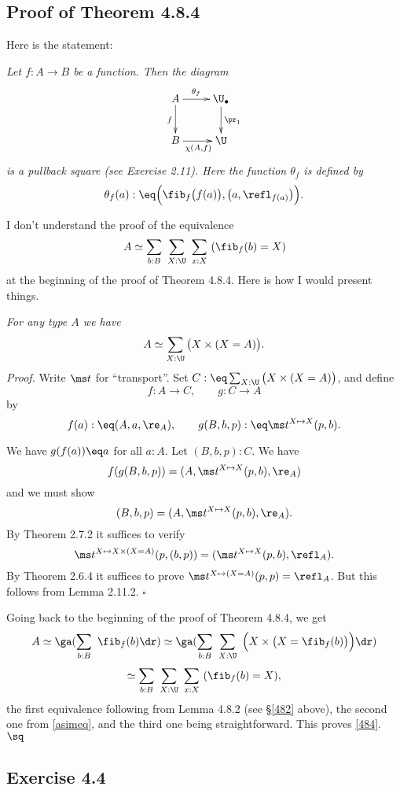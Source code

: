 \documentclass[12pt]{article}
\begin{document}

\subsection{Proof of Theorem 4.8.4}

Here is the statement:

\nn\emph{Let $f:A\to B$ be a function. Then the diagram
$$
\xymatrix{
A\ar[r]^-{\theta_f}\ar[d]_{f}&\U_\bullet\ar[d]^{\pr_1}\\
B\ar[r]_{\chi(A,f)} &\U}
$$ 
is a pullback square (see Exercise 2.11). Here the function $\theta_f$ is defined by}
$$
\theta_f(a):\eq\Big(\fib_f\big(f(a)\big),\big(a,\refl_{f(a)}\big)\Big).
$$

I don't understand the proof of the equivalence 
\begin{equation}\label{484}
A\simeq\sum_{b:B}\ \sum_{X:\U}\ \sum_{x:X}\ (\fib_f(b)=X)
\end{equation}
at the beginning of the proof of Theorem 4.8.4. Here is how I would present things. 

\nn{} \emph{For any type $A$ we have} 
\begin{equation}\label{asimeq}
A\simeq\sum_{X:\U}\big(X\times(X=A)\big).
\end{equation}
\emph{Proof.} Write $\ms t$ for ``transport''. Set $C:\eq\sum_{X:\U}\big(X\times(X=A)\big)$, and define 
$$
f:A\to C,\qquad g:C\to A
$$ 
by 
$$
f(a):\eq(A,a,\re_A),\qquad g(B,b,p):\eq\ms t^{X\mapsto X}(p,b).
$$ 

\nn We have $g(f(a))\eq a$ for all $a:A$. Let $(B,b,p):C$. We have 
$$
f(g(B,b,p))=(A,\ms t^{X\mapsto X}(p,b),\re_A)
$$ 
and we must show 
$$
(B,b,p)=(A,\ms t^{X\mapsto X}(p,b),\re_A).
$$
By Theorem 2.7.2 it suffices to verify 
$$
\ms t^{X\mapsto X\times(X=A)}(p,(b,p))=(\ms t^{X\mapsto X}(p,b),\refl_A).
$$ 
By Theorem 2.6.4 it suffices to prove $\ms t^{X\mapsto(X=A)}(p,p)=\refl_A$. But this follows from Lemma 2.11.2. $\square$

Going back to the beginning of the proof of Theorem 4.8.4, we get 
$$
A\simeq\ga(\sum_{b:B}\ \fib_f(b)\dr)\simeq\ga(\sum_{b:B}\ \sum_{X:\U}\ \Big(X\times\big(X=\fib_f(b)\big)\Big)\dr)
$$
$$
\simeq\sum_{b:B}\ \sum_{X:\U}\ \sum_{x:X}\ (\fib_f(b)=X),
$$ 
the first equivalence following from Lemma 4.8.2 (see \S\ref{482} above), the second one from \eqref{asimeq}, and the third one being straightforward. This proves \eqref{484}. $\sq$


\subsection{Exercise 4.4}
\end{document}
